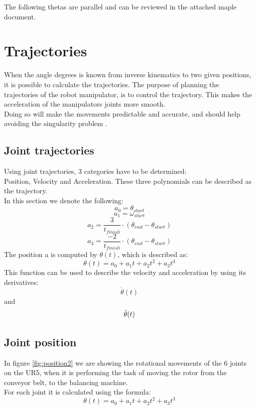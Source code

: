 The following thetas are parallel and can be reviewed in the attached maple document.\\


\section{Trajectories}
When the angle degrees is known from inverse kinematics to two given positions, it is possible to calculate the trajectories. The purpose of planning the trajectories of the robot manipulator, is to control the trajectory. This makes the acceleration of the manipulators joints more smooth.\\
Doing so will make the movements predictable and accurate, and should help avoiding the singularity problem \cite{Trajectory}. 


\subsection{Joint trajectories}

Using joint trajectories, 3 categories have to be determined:\\
Position, Velocity and Acceleration.
These three polynomials can be described as the trajectory.\\
In this section we denote the following:
\begin{equation}
    a_0 =\theta_{start} 
\end{equation}
\begin{equation}
    a_1 = \omega_{start}
\end{equation}
\begin{equation}
    a_2 = \frac{3}{t_{finish}} \cdot (\theta_{end} - \theta_{start})
\end{equation}
\begin{equation}
    a_3 = \frac{-2}{t_{finish}} \cdot (\theta_{end} - \theta_{start})
\end{equation}
The position a is computed by \(\theta(t)\), which is described as: \[\theta(t)=a_0+a_1t+a_2t^2+a_3t^3\]
This function can be used to describe the velocity and acceleration by using its derivatives\cite{JointTrajectories}:\[\Dot{\theta}(t)\] and \[\Ddot{\theta}(t)\]

\subsection{Joint position}
In figure \ref{fig:position2} we are showing the rotational movements of the 6 joints on the UR5, when it is performing the task of moving the rotor from the conveyor belt, to the balancing machine.\\
For each joint it is calculated using the formula: 
\begin{equation}
  \theta(t)=a_0+a_1t+a_2t^2+a_3t^3
\end{equation}

